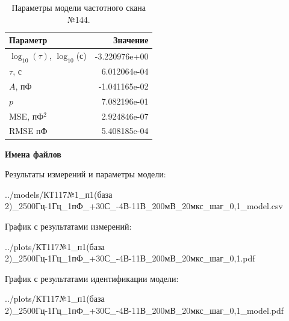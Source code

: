 \begin{table}[!ht]
    \centering
    \caption{Параметры модели частотного скана №144.}
    \begin{tabular}{|l|r|}
        \hline
        Параметр                                       & Значение                  \\ \hline
        $\log_{10}(\tau)$, $\log_{10}$(с)              & -3.220976e+00             \\ \hline
        $\tau$, с                                      & 6.012064e-04              \\ \hline
        $A$, пФ                                        & -1.041165e-02             \\ \hline
        $p$                                            & 7.082196e-01              \\ \hline
        MSE, пФ$^2$                                    & 2.924846e-07              \\ \hline
        RMSE пФ                                        & 5.408185e-04              \\ \hline
    \end{tabular}
    \label{table:frequency_scan_model_144}
\end{table}

\textbf{Имена файлов}

Результаты измерений и параметры модели:

\scriptsize../models/КТ117№1\_п1(база 2)\_2500Гц-1Гц\_1пФ\_+30С\_-4В-11В\_200мВ\_20мкс\_шаг\_0,1\_model.csv
\normalsize

График с результатами измерений:

\scriptsize../plots/КТ117№1\_п1(база 2)\_2500Гц-1Гц\_1пФ\_+30С\_-4В-11В\_200мВ\_20мкс\_шаг\_0,1.pdf
\normalsize

График с результатами идентификации модели:

\scriptsize../plots/КТ117№1\_п1(база 2)\_2500Гц-1Гц\_1пФ\_+30С\_-4В-11В\_200мВ\_20мкс\_шаг\_0,1\_model.pdf
\normalsize


